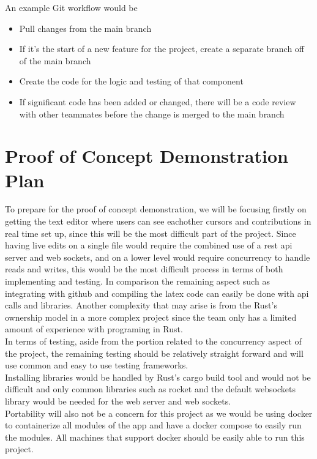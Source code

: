 \documentclass{article}
\begin{document}
An example Git workflow would be 
\begin{itemize}
    \item Pull changes from the main branch
    \item If it's the start of a new feature for the project, create a separate branch off of the main branch
    \item Create the code for the logic and testing of that component
    \item If significant code has been added or changed, there will be a code review with other teammates before the change is merged to the main branch
\end{itemize}

\section{Proof of Concept Demonstration Plan}

To prepare for the proof of concept demonstration, we will be focusing firstly on getting the text editor where users can see eachother cursors and contributions in real time set up, since this will be the most difficult part of the project.
Since having live edits on a single file would require the combined use of a rest api server and web sockets, and on a lower level would require concurrency to handle reads and writes, this would be the most difficult process in terms of 
both implementing and testing. In comparison the remaining aspect such as integrating with github and compiling the latex code can easily be done with api calls and libraries. Another complexity that may arise is from the Rust's ownership
model in a more complex project since the team only has a limited amount of experience with programing in Rust.\\

In terms of testing, aside from the portion related to the concurrency aspect of the project, the remaining testing should be relatively straight forward and will use common and easy to use testing frameworks.\\

Installing libraries would be handled by Rust's cargo build tool and would not be difficult and only common libraries such as rocket and the default websockets library would be needed for the web server and web sockets.\\

Portability will also not be a concern for this project as we would be using docker to containerize all modules of the app and have a docker compose to easily run the modules. All machines that support docker should be easily able to run this
project.\\
\end{document}
